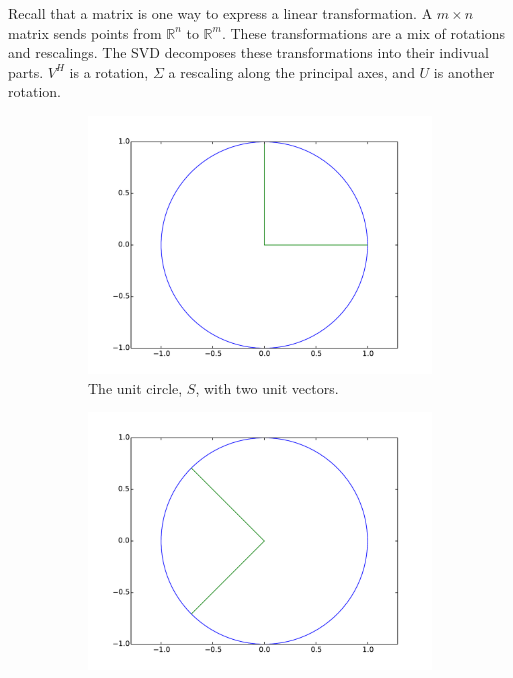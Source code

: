 Recall that a matrix is one way to express a linear transformation.
A $m\times n$ matrix sends points from $\mathbb{R}^n$ to $\mathbb{R}^m$.
These transformations are a mix of rotations and rescalings.
The SVD decomposes these transformations into their indivual parts.
$V^H$ is a rotation, $\Sigma$ a rescaling along the principal axes, and $U$ is another rotation.


\begin{figure}
\centering
\begin{subfigure}[b]{.49\textwidth}
  \centering
  \includegraphics[width=\textwidth]{unit_circle.pdf}
  \caption{The unit circle, $S$, with two unit vectors.}
\end{subfigure}
\begin{subfigure}[b]{.49\textwidth}
  \centering
  \includegraphics[width=\textwidth]{vcircle.pdf}

\end{subfigure}
\end{figure}
